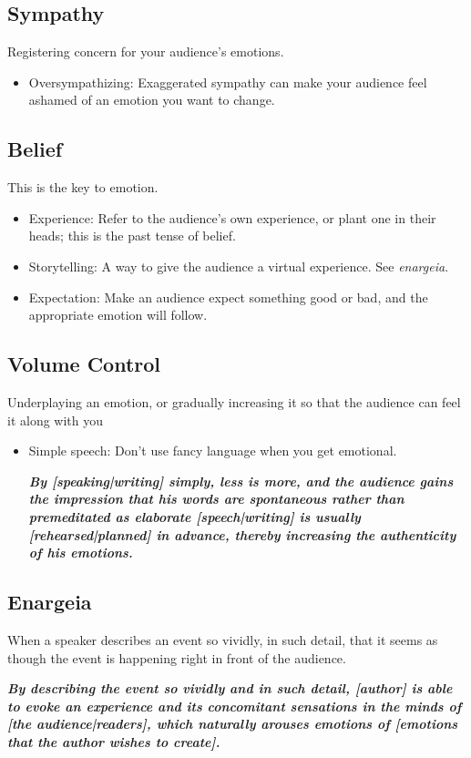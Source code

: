 \subsection{Sympathy}
Registering concern for your audience's emotions.
\begin{itemize}
	\item Oversympathizing: Exaggerated sympathy can make your audience feel ashamed of an emotion you want to change.
\end{itemize}

\subsection{Belief}
This is the key to emotion.
\begin{itemize}
	\item Experience: Refer to the audience's own experience, or plant one in their heads; this is the past tense of belief.
	\item Storytelling: A way to give the audience a virtual experience. See \emph{enargeia}.
	\item Expectation: Make an audience expect something good or bad, and the appropriate emotion will follow.
\end{itemize}

\subsection{Volume Control}
Underplaying an emotion, or gradually increasing it so that the audience can feel it along with you
\begin{itemize}
	\item Simple speech: Don't use fancy language when you get emotional.
	
\emph{\textbf{By [speaking|writing] simply, less is more, and the audience gains the impression that his words are spontaneous rather than premeditated as elaborate [speech|writing] is usually [rehearsed|planned] in advance, thereby increasing the authenticity of his emotions.
}}\end{itemize}

\subsection{Enargeia}
When a speaker describes an event so vividly, in such detail, that it seems as though the event is happening right in front of the audience.

\textbf{\emph{By describing the event so vividly and in such detail, [author] is able to evoke an experience and its concomitant sensations in the minds of [the audience|readers], which naturally arouses emotions of [emotions that the author wishes to create].}}

